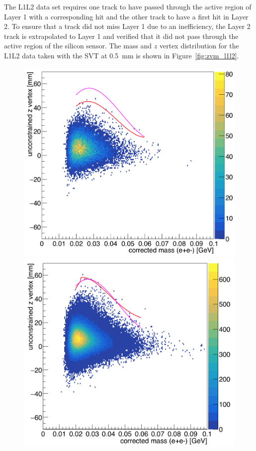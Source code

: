 The L1L2 data set requires one track to have passed through the active region of Layer 1 with a corresponding hit and the other track to have a first hit in Layer 2. To ensure that a track did not miss Layer 1 due to an inefficiency, the Layer 2 track is extrapolated to Layer 1 and verified that it did not pass through the active region of the silicon sensor. The mass and $z$ vertex distribution for the L1L2 data taken with the SVT at 0.5~mm is shown in Figure~\ref{fig:zvm_l1l2}.
\begin{figure}[hbt]
\begin{minipage}{0.5\textwidth}
 \includegraphics[width=\textwidth]{pics/appendix/zVm_L1L2_0p5_bl.png}
\end{minipage}\hfill\begin{minipage}{0.5\textwidth}
 \includegraphics[width=\textwidth]{pics/appendix/zVm_L1L2_0p5_ub.png}

\end{minipage}
\end{figure}
